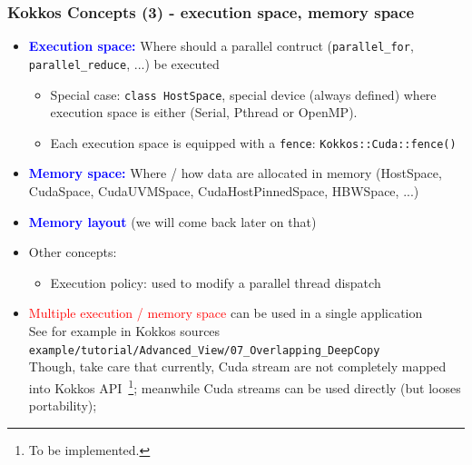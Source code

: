 \begin{frame}
  \frametitle{Kokkos Concepts (3) - execution space, memory space}

  \begin{itemize}
  \item \textcolor{blue}{\textbf{Execution space:}} Where should a parallel contruct (\texttt{parallel\_for}, \texttt{parallel\_reduce}, ...) be executed\\
    \begin{itemize}
    \item Special case: \texttt{class HostSpace}, special device (always defined) where execution space is either (Serial, Pthread or OpenMP).
    \item Each execution space is equipped with a \texttt{fence}: \texttt{Kokkos::Cuda::fence()}
    \end{itemize}
  \item \textcolor{blue}{\textbf{Memory space:}} Where / how data are allocated in memory (HostSpace, CudaSpace, CudaUVMSpace, CudaHostPinnedSpace, HBWSpace, ...)
  \item \textcolor{blue}{\textbf{Memory layout}} (we will come back later on that)
  \item Other concepts:
    \begin{itemize}
    \item Execution policy: used to modify a parallel thread dispatch
    \end{itemize}
  \item \textcolor{red}{Multiple execution / memory space} can be used in a single application\\
    See for example in Kokkos sources \texttt{example/tutorial/Advanced\_View/07\_Overlapping\_DeepCopy}\\
    Though, take care that currently, Cuda stream are not completely mapped into Kokkos API~\footnote{To be implemented.}; meanwhile Cuda streams can be used directly (but looses portability); 
  \end{itemize}

\end{frame}

